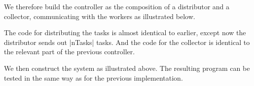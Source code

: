 We therefore build the controller as the composition of a distributor and a
collector, communicating with the workers as illustrated below.
%
\begin{center}
\end{center}


The code for distributing the tasks is almost identical to earlier, except now
the distributor sends out |nTasks| tasks.  And the code for the collector is
identical to the relevant part of the previous controller. 

We then construct the system as illustrated above.  The resulting program can
be tested in the same way as for the previous implementation. 

